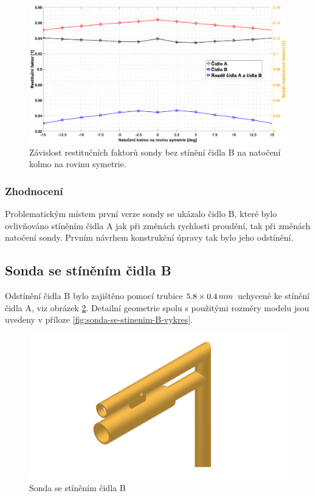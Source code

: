              \begin{figure}[ht!]
                \centering
                \includegraphics*[width=\textwidth, trim={5.9cm 1.0cm 2.7cm 2.0cm}]{400_SIMULACE_KONSTRUKCNICH_UPRAV/Grafy/01_kolma_rovina}
                \caption{Závislost restitučních faktorů sondy bez stínění čidla B na natočení kolmo na rovinu symetrie.}
                \label{fig:sonda-bez-stineni-kolma-rovina}
            \end{figure}

        \subsubsection{Zhodnocení}
            Problematickým místem první verze sondy se ukázalo čidlo B, které bylo ovlivňováno stíněním čidla A jak při změnách rychlosti proudění, tak při změnách natočení sondy. Prvním návrhem konstrukční úpravy tak bylo jeho odstínění.
    
    \subsection{Sonda se stíněním čidla B}
        Odstínění čidla B bylo zajištěno pomocí trubice $5.8 \times 0.4 \, mm$ uchycené ke stínění čidla A, viz obrázek \ref{fig:sonda-se-stinenim-B}. Detailní geometrie spolu s použitými rozměry modelu jsou uvedeny v příloze \ref{fig:sonda-se-stinenim-B-vykres}. 
        
        \begin{figure}[ht!]
            \centering
            \includegraphics[width=\textwidth]{400_SIMULACE_KONSTRUKCNICH_UPRAV/Vykresy_rendery/Sonda_se_stinenim_B.png}
            \caption{Sonda se stíněním čidla B}
            \label{fig:sonda-se-stinenim-B}
        \end{figure}

